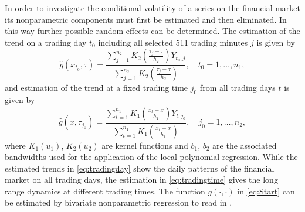 \documentclass[12pt]{article}
\begin{document}
In order to investigate the conditional volatility of a series on the financial market its nonparametric components must first be estimated and then eliminated. 
In this way further possible random effects can be determined.
The estimation of the trend on a trading day \( t_0 \) including all selected 511 trading minutes \( j \) is given by
\begin{equation}
\label{eq:tradingday}
\hat{g}(x_{t_0},\tau) = \frac{\sum_{j=1}^{n_2} K_2 \left(\frac{\tau_j - \tau}{h_2}\right)Y_{t_0,j}}{\sum_{j=1}^{n_2} K_2 \left(\frac{\tau_j - \tau}{h_2}\right)}, \quad t_0 = 1,\ldots,n_1,
\end{equation}
and estimation of the trend at a fixed trading time \( j_0 \) from all trading days \( t \) is given by
\begin{equation}
\label{eq:tradingtime}
\hat{g}(x,\tau_{j_0}) = \frac{\sum_{t=1}^{n_1} K_1 \left(\frac{x_t - x}{h_1}\right)Y_{t,j_0}}{\sum_{t=1}^{n_1} K_1 \left(\frac{x_t - x}{h_1}\right)}, \quad j_0 = 1,\ldots,n_2,
\end{equation}
where \(K_1(u_1)\), \(K_2(u_2)\) are kernel functions and \(b_1\), \(b_2\) are the associated bandwidths used for the application of the local polynomial regression. 
While the estimated trends in \eqref{eq:tradingday} show the daily patterns of the financial market on all trading days, the estimation in \eqref{eq:tradingtime} gives the long range dynamics at different trading times.
The function \( g(\cdot,\cdot) \) in \eqref{eq:Start} can be estimated by bivariate nonparametric regression to read in  \textcite{ruppert1994multivariate,hardle1997multivariate,scott2015multivariate}. 
\end{document}
